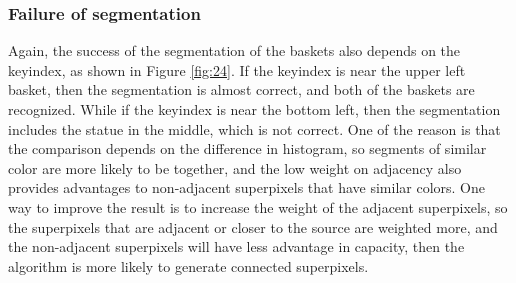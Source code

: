 \subsubsection{Failure of segmentation}
Again, the success of the segmentation of the baskets also depends on the keyindex, as shown in Figure \ref{fig:24}.
If the keyindex is near the upper left basket, then the segmentation is almost correct, and both of the baskets are recognized.
While if the keyindex is near the bottom left, then the segmentation includes the statue in the middle, which is not correct.
One of the reason is that the comparison depends on the difference in histogram, so segments of similar color are more likely to be together, and the low weight on adjacency also provides advantages to non-adjacent superpixels that have similar colors.
One way to improve the result is to increase the weight of the adjacent superpixels, so the superpixels that are adjacent or closer to the source are weighted more, and the non-adjacent superpixels will have less advantage in capacity, then the algorithm is more likely to generate connected superpixels.
